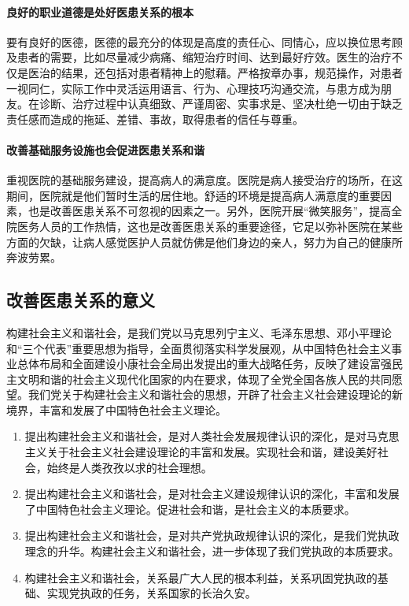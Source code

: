 \documentclass[11pt,twoside,a4paper]{article}
\begin{document}
		\paragraph{良好的职业道德是处好医患关系的根本 }
		要有良好的医德，医德的最充分的体现是高度的责任心、同情心，应以换位思考顾及患者的需要，比如尽量减少病痛、缩短治疗时间、达到最好疗效。医生的治疗不仅是医治的结果，还包括对患者精神上的慰藉。严格按章办事，规范操作，对患者一视同仁，实际工作中灵活运用语言、行为、心理技巧沟通交流，与患方成为朋友。在诊断、治疗过程中认真细致、严谨周密、实事求是、坚决杜绝一切由于缺乏责任感而造成的拖延、差错、事故，取得患者的信任与尊重。 
		\paragraph{改善基础服务设施也会促进医患关系和谐 }
		重视医院的基础服务建设，提高病人的满意度。医院是病人接受治疗的场所，在这期间，医院就是他们暂时生活的居住地。舒适的环境是提高病人满意度的重要因素，也是改善医患关系不可忽视的因素之一。另外，医院开展“微笑服务”，提高全院医务人员的工作热情，这也是改善医患关系的重要途径，它足以弥补医院在某些方面的欠缺，让病人感觉医护人员就仿佛是他们身边的亲人，努力为自己的健康所奔波劳累。 
		\subsection{改善医患关系的意义}
		构建社会主义和谐社会，是我们党以马克思列宁主义、毛泽东思想、邓小平理论和“三个代表”重要思想为指导，全面贯彻落实科学发展观，从中国特色社会主义事业总体布局和全面建设小康社会全局出发提出的重大战略任务，反映了建设富强民主文明和谐的社会主义现代化国家的内在要求，体现了全党全国各族人民的共同愿望。我们党关于构建社会主义和谐社会的思想，开辟了社会主义社会建设理论的新境界，丰富和发展了中国特色社会主义理论。
		\begin{enumerate}
			\item 提出构建社会主义和谐社会，是对人类社会发展规律认识的深化，是对马克思主义关于社会主义社会建设理论的丰富和发展。实现社会和谐，建设美好社会，始终是人类孜孜以求的社会理想。
			\item 提出构建社会主义和谐社会，是对社会主义建设规律认识的深化，丰富和发展了中国特色社会主义理论。促进社会和谐，是社会主义的本质要求。
			\item 提出构建社会主义和谐社会，是对共产党执政规律认识的深化，是我们党执政理念的升华。构建社会主义和谐社会，进一步体现了我们党执政的本质要求。 
			\item 构建社会主义和谐社会，关系最广大人民的根本利益，关系巩固党执政的基础、实现党执政的任务，关系国家的长治久安。
		\end{enumerate}
\end{document}
